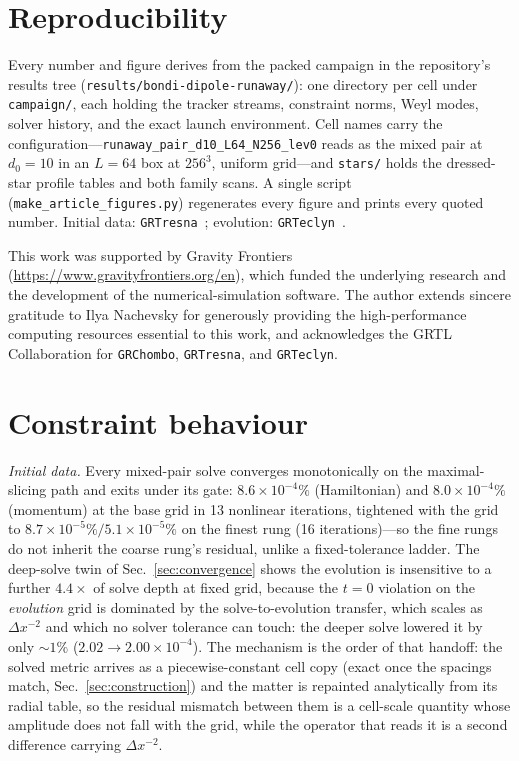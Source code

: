 \documentclass[twocolumn,floatfix,aps,prd,nofootinbib]{revtex4-2}
\begin{document}
\section{Reproducibility}
\label{sec:repro}

Every number and figure derives from the packed campaign in the repository's results tree (\texttt{results/bondi-dipole-runaway/}): one directory per cell under \texttt{campaign/}, each holding the tracker streams, constraint norms, Weyl modes, solver history, and the exact launch environment. Cell names carry the configuration---\texttt{runaway\_pair\_d10\_L64\_N256\_lev0} reads as the mixed pair at $d_0=10$ in an $L=64$ box at $256^3$, uniform grid---and \texttt{stars/} holds the dressed-star profile tables and both family scans. A single script (\texttt{make\_article\_figures.py}) regenerates every figure and prints every quoted number. Initial data: \texttt{GRTresna}~\cite{grtresna}; evolution: \texttt{GRTeclyn}~\cite{grteclyn,amrex,grchombo}.

\begin{acknowledgments}
This work was supported by Gravity Frontiers
(\url{https://www.gravityfrontiers.org/en}), which funded the underlying
research and the development of the numerical-simulation software. The author
extends sincere gratitude to Ilya Nachevsky for generously providing the
high-performance computing resources essential to this work, and acknowledges
the GRTL Collaboration for \texttt{GRChombo}, \texttt{GRTresna}, and
\texttt{GRTeclyn}.
\end{acknowledgments}

\appendix

\section{Constraint behaviour}
\label{app:constraints}

\emph{Initial data.} Every mixed-pair solve converges monotonically on the maximal-slicing path and exits under its gate: $8.6\times10^{-4}\%$ (Hamiltonian) and $8.0\times10^{-4}\%$ (momentum) at the base grid in 13 nonlinear iterations, tightened with the grid to $8.7\times10^{-5}\%/5.1\times10^{-5}\%$ on the finest rung (16 iterations)---so the fine rungs do not inherit the coarse rung's residual, unlike a fixed-tolerance ladder. The deep-solve twin of Sec.~\ref{sec:convergence} shows the evolution is insensitive to a further $4.4\times$ of solve depth at fixed grid, because the $t=0$ violation on the \emph{evolution} grid is dominated by the solve-to-evolution transfer, which scales as $\Delta x^{-2}$ and which no solver tolerance can touch: the deeper solve lowered it by only ${\sim}1\%$ ($2.02\rightarrow2.00\times10^{-4}$). The mechanism is the order of that handoff: the solved metric arrives as a piecewise-constant cell copy (exact once the spacings match, Sec.~\ref{sec:construction}) and the matter is repainted analytically from its radial table, so the residual mismatch between them is a cell-scale quantity whose amplitude does not fall with the grid, while the operator that reads it is a second difference carrying $\Delta x^{-2}$.
\end{document}
